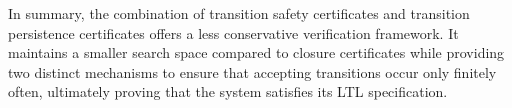 In summary, the combination of transition safety certificates and transition persistence certificates offers a less conservative verification framework. It maintains a smaller search space compared to closure certificates while providing two distinct mechanisms to ensure that accepting transitions occur only finitely often, ultimately proving that the system satisfies its LTL specification.

